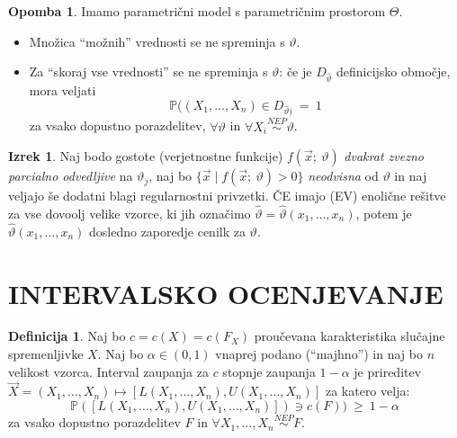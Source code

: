 \documentclass[11pt]{article}
\newcommand{\p}{\mathbb{P}}
\newcommand{\1}{\mathbbm{1}}
\theoremstyle{definition}
\newtheorem{definicija}{Definicija}[section]
\theoremstyle{definition}
\theoremstyle{definition}
\newtheorem{izrek}{Izrek}[section]
\newtheorem*{opomba}{Opomba}
\begin{document}
\begin{opomba}

Imamo parametrični model s parametričnim prostorom $\Theta$.
\begin{itemize}
	
	\item Množica ``možnih'' vrednosti se ne spreminja s $\vartheta$.
	
	\item Za ``skoraj vse vrednosti'' se ne spreminja s $\vartheta$: če je $D_{\hat{\vartheta}}$ definicijsko območje, mora veljati
	$$\p((X_1, \ldots, X_n) \in D_{\hat{\vartheta})} ~=~ 1$$
	za vsako dopustno porazdelitev, $\forall \vartheta$ in $\forall X_i \overset{NEP}{\sim} \vartheta$.	
	
\end{itemize}

\end{opomba}
\vspace{0.5cm}

\begin{izrek}

Naj bodo gostote (verjetnostne funkcije) $f(\vec{x};~\vartheta)$ \textit{dvakrat zvezno parcialno odvedljive} na $\vartheta_j$, naj bo $\{ \vec{x} \mid f(\vec{x};~\vartheta) > 0 \}$ \textit{neodvisna} od $\vartheta$ in naj veljajo še dodatni blagi regularnostni privzetki. ČE imajo (EV) enolične rešitve za vse dovoolj velike vzorce, ki jih označimo $\hat{\vartheta} = \hat{\vartheta}(x_1, \ldots, x_n)$, potem je $\hat{\vartheta}(x_1, \ldots, x_n)$ dosledno zaporedje cenilk za $\vartheta$.

\end{izrek}
\vspace{0.5cm}


\pagebreak


\section{INTERVALSKO OCENJEVANJE}
\vspace{0.5cm}

\begin{definicija}

Naj bo $c = c(X) = c(F_X)$ proučevana karakteristika slučajne spremenljivke $X$. Naj bo $\alpha \in (0, 1)$ vnaprej podano (``majhno'')  in naj bo $n$ velikost vzorca. Interval zaupanja za $c$ stopnje zaupanja $1 - \alpha$ je prireditev $\vec{X} = (X_1, \ldots, X_n) \mapsto [L(X_1, \ldots, X_n), U(X_1, \ldots, X_n)]$ za katero velja:
$$\p([L(X_1, \ldots, X_n), U(X_1, \ldots, X_n)]) \ni c(F)) ~\geq~ 1 - \alpha$$
za vsako dopustno porazdelitev $F$ in $\forall X_1, \ldots, X_n \overset{NEP}{\sim} F$.

\end{definicija}
\vspace{0.5cm}
\end{document}
